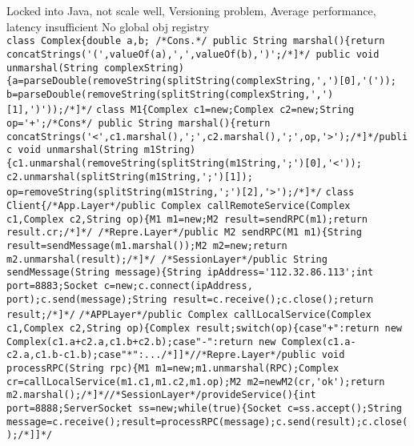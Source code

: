 \btext{--:}
Locked into Java,
not scale well,
Versioning problem,
Average performance,
latency insufficient
No global obj registry
\\
\lstinline{class Complex{double a,b; /*Cons.*/ public String marshal(){return concatStrings('(',valueOf(a),',',valueOf(b),')';/*]*/ public void unmarshal(String complexString){a=parseDouble(removeString(splitString(complexString,',')[0],'(')); b=parseDouble(removeString(splitString(complexString,',')[1],')'));/*]*/}
\lstinline{class M1{Complex c1=new;Complex c2=new;String op='+';/*Cons*/ public String marshal(){return concatStrings('<',c1.marshal(),';',c2.marshal(),';',op,'>');/*]*/public void unmarshal(String m1String){c1.unmarshal(removeString(splitString(m1String,';')[0],'<')); c2.unmarshal(splitString(m1String,';')[1]); op=removeString(splitString(m1String,';')[2],'>');/*]*/}
\lstinline{class Client{/*App.Layer*/public Complex callRemoteService(Complex c1,Complex c2,String op){M1 m1=new;M2 result=sendRPC(m1);return result.cr;/*]*/ /*Repre.Layer*/public M2 sendRPC(M1 m1){String result=sendMessage(m1.marshal());M2 m2=new;return m2.unmarshal(result);/*]*/ /*SessionLayer*/public String sendMessage(String message){String ipAddress='112.32.86.113';int port=8883;Socket c=new;c.connect(ipAddress, port);c.send(message);String result=c.receive();c.close();return result;/*]*/}
\lstinline{/*APPLayer*/public Complex callLocalService(Complex c1,Complex c2,String op){Complex result;switch(op){case"+":return new Complex(c1.a+c2.a,c1.b+c2.b);case"-":return new Complex(c1.a-c2.a,c1.b-c1.b);case"*":.../*]]*//*Repre.Layer*/public void processRPC(String rpc){M1 m1=new;m1.unmarshal(RPC);Complex cr=callLocalService(m1.c1,m1.c2,m1.op);M2 m2=newM2(cr,'ok');return m2.marshal();/*]*//*SessionLayer*/provideService(){int port=8888;ServerSocket ss=new;while(true){Socket c=ss.accept();String message=c.receive();result=processRPC(message);c.send(result);c.close();/*]]*/}
